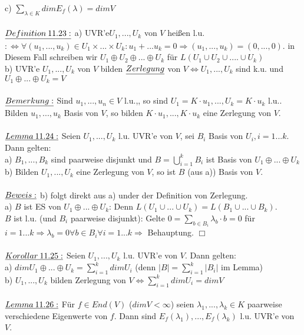 \documentclass[fleqn, a4paper, 11pt]{article}
\begin{document}
c) $\sum\limits_{\lambda\in K} dim E_f(\lambda)=dim V$\\
\\
$\uline{Definition\:11.23:}$ a) UVR'e$U_1,...,U_k$ von $V$ hei\ss{}en l.u. $:\Leftrightarrow \forall(u_1,...,u_k)\in U_1\times...\times U_k:u_1+...u_k=0\Rightarrow(u_1,...,u_k)=(0,...,0).$ in Diesem Fall schreiben wir $U_1\oplus U_2\oplus...\oplus U_k$ f\"ur $L(U_1\cup U_2\cup....\cup U_k)$\\
b) UVR'e $U_1,...,U_k$ von $V$ bilden $\uline{Zerlegung}$ von $V\Leftrightarrow U_1,...,U_k$ sind k.u. und $U_1\oplus...\oplus U_k=V$\\
\\
$\uline{Bemerkung:}$ Sind $u_1,...,u_n\in V$ l.u.,, so sind $U_1=K\cdot u_1,...,U_k=K\cdot u_k$ l.u.. Bilden $u_1,...,u_k$ Basis von $V$, so bilden $K\cdot u_1,...,K\cdot u_k$ eine Zerlegung von $V$.\\
\\
$\uline{Lemma\:11.24:}$ Seien $U_1,...,U_k$ l.u. UVR'e von $V$, sei $B_i$ Basis von $U_i,i=1...k$. Dann gelten:\\
a) $B_1,...,B_k$ sind paarweise disjunkt und $B=\bigcup\limits_{i=1}^k B_i$ ist Basis von $U_1\oplus...\oplus U_k$\\
b) Bilden $U_1,...,U_k$ eine Zerlegung von $V$, so ist $B$ (aus a)) Basis von $V$.\\
\\
$\uline{Beweis:}$ b) folgt direkt aus a) under der Definition von Zerlegung.\\
a) $B$ ist ES von $U_1\oplus...\oplus U_k$: Denn $L(U_1\cup...\cup U_k)=L(B_1\cup...\cup B_k)$.\\
$B$ ist l.u. (und $B_i$ paarweise disjunkt): Gelte $0=\sum\limits_{b\in B_i}\lambda_b\cdot b=0$ f\"ur $i=1...k\Rightarrow \lambda_b=0\forall b\in B_i \forall i=1...k\Rightarrow$ Behauptung. \hfill $\Box$\\
\\
$\uline{Korollar\:11.25:}$ Seien $U_1,...,U_k$ l.u. UVR'e von $V$. Dann gelten:\\
a) $dim U_1\oplus...\oplus U_k=\sum\limits_{i=1}^k dim U_i$ (denn $|B|=\sum\limits_{i=1}^k |B_i|$ im Lemma)\\
b) $U_1,...,U_k$ bilden Zerlegung von $V\Leftrightarrow\sum\limits_{i=1}^k dim U_i=dim V$\\
\\
$\uline{Lemma\:11.26:}$ F\"ur $f\in End(V)$ ($dim V<\infty$) seien $\lambda_1,...,\lambda_k\in K$ paarweise verschiedene Eigenwerte von $f$. Dann sind $E_f(\lambda_1),...,E_f(\lambda_k)$ l.u. UVR'e von $V$.\\
\end{document}

